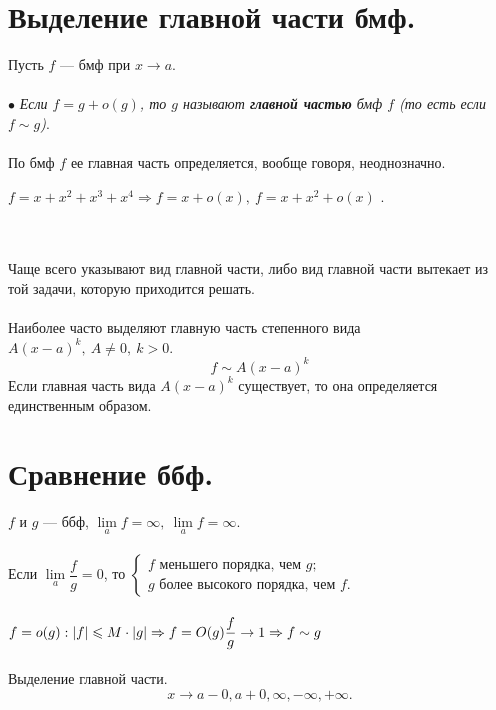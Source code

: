 \section{Выделение главной части бмф.}
Пусть $f$ --- бмф при $x \rightarrow a$.\\\\
$\bullet$\textit{ Если $f = g + o(g)$, то $g$ называют \textbf{главной частью} бмф $f$ (то есть если $f \sim g$)}.\\\\
По бмф $f$ ее главная часть определяется, вообще говоря, неоднозначно.\\
\begin{example}
	$f = x + x^2 + x^3 + x^4 \Rightarrow f = x +o(x),\ f = x + x^2 + o(x)$ .
\end{example}\\\\
Чаще всего указывают вид главной части, либо вид главной части вытекает из той задачи, которую приходится решать.\\\\
Наиболее часто выделяют главную часть степенного вида $A(x - a)^k,\ A \neq 0,\ k > 0$.
$$f \sim A(x - a)^k$$
Если главная часть вида $A(x - a)^k$ существует, то она определяется единственным образом.
\section{Сравнение ббф.}
$f$ и $g$ --- ббф, $\lim\limits_{a}f = \infty,\ \lim\limits_{a}f = \infty$.\\\\
Если $ \lim\limits_{a}\dfrac{f}{g} = 0$, то $\begin{cases} f \text{ меньшего порядка, чем } g;\\
	g \text{ более высокого порядка, чем } f. \end{cases}$\\\\
$f = o(g): \vert f \vert \leqslant M\cdot \vert g \vert \Rightarrow f = O(g)\\
\dfrac{f}{g} \rightarrow 1 \Rightarrow f \sim g$\\\\
Выделение главной части.
$$x \rightarrow a - 0, a + 0, \infty, -\infty, +\infty.$$

